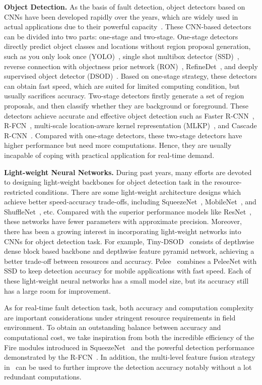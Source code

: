 \textbf{Object Detection.}
As the basis of fault detection, object detectors based on CNNs have been developed rapidly over the years, which are widely used in actual applications due to their powerful capacity~\cite{lu2018estimation}. These CNN-based detectors can be divided into two parts: one-stage and two-stage. One-stage detectors directly predict object classes and locations without region proposal generation, such as you only look once (YOLO)~\cite{redmon2018yolov3}, single shot multibox detector (SSD)~\cite{LiuAESRFB16}, reverse connection with objectness prior network (RON)~\cite{kong2017ron}, RefineDet~\cite{zhang2018single}, and deeply supervised object detector (DSOD)~\cite{shen2017dsod}. Based on one-stage strategy, these detectors can obtain fast speed, which are suited for limited computing condition, but usually sacrifices accuracy. Two-stage detectors firstly generate a set of region proposals, and then classify whether they are background or foreground. These detectors achieve accurate and effective object detection such as Faster R-CNN~\cite{RenHGS15}, R-FCN~\cite{DaiLHS16}, multi-scale location-aware kernel representation (MLKP)~\cite{wang2018multi}, and Cascade R-CNN~\cite{cai2018cascade}. Compared with one-stage detectors, these two-stage detectors have higher performance but need more computations. Hence, they are usually incapable of coping with practical application for real-time demand.

\textbf{Light-weight Neural Networks.}
During past years, many efforts are devoted to designing light-weight backbones for object detection task in the resource-restricted conditions. There are some light-weight architecture designs which achieve better speed-accuracy trade-offs, including SqueezeNet~\cite{iandola2016squeezenet}, MobileNet~\cite{sandler2018inverted}, and ShuffleNet~\cite{ma2018shufflenet}, etc. Compared with the superior performance models like ResNet~\cite{He2016Deep}, these networks have fewer parameters with approximate precision. Moreover, there has been a growing interest in incorporating light-weight networks into CNNs for object detection task. For example, Tiny-DSOD~\cite{yuxi2018tinydsod} consists of depthwise dense block based backbone and depthwise feature pyramid network, achieving a better trade-off between resources and accuracy. Pelee~\cite{wang2018pelee} combines a PeleeNet with SSD to keep detection accuracy for mobile applications with fast speed. Each of these light-weight neural networks has a small model size, but its accuracy still has a large room for improvement.

As for real-time fault detection task, both accuracy and computation complexity are important considerations under stringent resource requirements in field environment. To obtain an outstanding balance between accuracy and computational cost, we take inspiration from both the incredible efficiency of the Fire modules introduced in SqueezeNet~\cite{iandola2016squeezenet} and the powerful detection performance demonstrated by the R-FCN~\cite{DaiLHS16}. In addition, the multi-level feature fusion strategy in~\cite{8911418} can be used to further improve the detection accuracy notably without a lot redundant computations.

